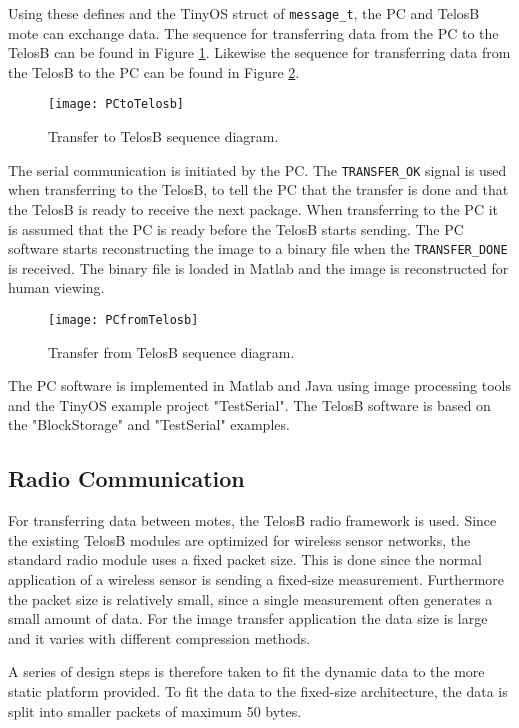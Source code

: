 Using these defines and the TinyOS struct of \texttt{message\_t}, the PC and TelosB mote can exchange data. 
The sequence for transferring data from the PC to the TelosB can be found in Figure \ref{transfertotelos}. 
Likewise the sequence for transferring data from the TelosB to the PC can be found in Figure \ref{transferfromtelos}.

\begin{figure}[H]
	\centering
	\texttt{[image: PCtoTelosb]}
	\caption{Transfer to TelosB sequence diagram.}
	\label{transfertotelos}
\end{figure}

The serial communication is initiated by the PC.
The \texttt{TRANSFER\_OK} signal is used when transferring to the TelosB, to tell the PC that the transfer is done and that the TelosB is ready to receive the next package.
When transferring to the PC it is assumed that the PC is ready before the TelosB starts sending.
The PC software starts reconstructing the image to a binary file when the \texttt{TRANSFER\_DONE} is received.
The binary file is loaded in Matlab and the image is reconstructed for human viewing.
\begin{figure}[H]
	\centering
	\texttt{[image: PCfromTelosb]}
	\caption{Transfer from TelosB sequence diagram.}
	\label{transferfromtelos}
\end{figure}
The PC software is implemented in Matlab and Java using image processing tools and the TinyOS example project "TestSerial".
The TelosB software is based on the "BlockStorage" and "TestSerial" examples.


\subsection{Radio Communication}\label{sec:Radio-Block}

For transferring data between motes, the TelosB radio framework is used. 
Since the existing TelosB modules are optimized for wireless sensor networks, the standard radio module uses a fixed packet size. 
This is done since the normal application of a wireless sensor is sending a fixed-size measurement. 
Furthermore the packet size is relatively small, since a single measurement often generates a small amount of data. 
For the image transfer application the data size is large and it varies with different compression methods.

A series of design steps is therefore taken to fit the dynamic data to the more static platform provided. 
To fit the data to the fixed-size architecture, the data is split into smaller packets of maximum 50 bytes. 


